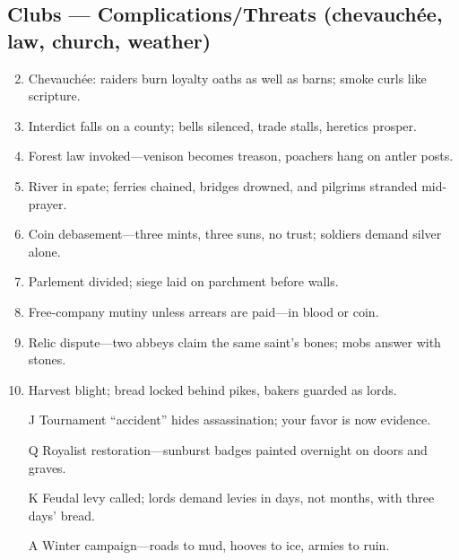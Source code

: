 \subsection*{Clubs --- Complications/Threats (chevauchée, law, church, weather)}
\label{sec:vhasia-complications}
\begin{enumerate}
\setcounter{enumi}{1}
\item Chevauchée: raiders burn loyalty oaths as well as barns; smoke curls like scripture.
\item Interdict falls on a county; bells silenced, trade stalls, heretics prosper.
\item Forest law invoked—venison becomes treason, poachers hang on antler posts.
\item River in spate; ferries chained, bridges drowned, and pilgrims stranded mid-prayer.
\item Coin debasement—three mints, three suns, no trust; soldiers demand silver alone.
\item Parlement divided; siege laid on parchment before walls.
\item Free-company mutiny unless arrears are paid—in blood or coin.
\item Relic dispute—two abbeys claim the same saint’s bones; mobs answer with stones.
\item Harvest blight; bread locked behind pikes, bakers guarded as lords.
\item[J] Tournament “accident” hides assassination; your favor is now evidence.
\item[Q] Royalist restoration—sunburst badges painted overnight on doors and graves.
\item[K] Feudal levy called; lords demand levies in days, not months, with three days’ bread.
\item[A] Winter campaign—roads to mud, hooves to ice, armies to ruin.
\end{enumerate}

